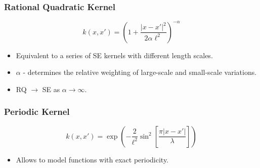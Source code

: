 \begin{frame} \frametitle{Rational Quadratic Kernel}
\begin{equation}
  k(x,x') = \left( 1 + \frac{\left|x-x'\right|^2}{2\alpha\ell^2} \right)^{-\alpha}
\end{equation}
\begin{itemize}
  \item Equivalent to a series of SE kernels with different length scales.
  \item $\alpha$ - determines the relative weighting of large-scale and
    small-scale variations.
  \item RQ $\rightarrow$ SE as $\alpha\rightarrow\infty$.
\end{itemize}
\begin{center}
\end{center}
\end{frame}

\begin{frame} \frametitle{Periodic Kernel}
\begin{equation}
  k(x,x') = \exp\left(-\frac{2}{\ell^2}\sin^2\left[\frac{\pi|x - x'|}{\lambda}\right]\right)
\end{equation}
\begin{itemize}
  \item Allows to model functions with exact periodicity.
\end{itemize}
\end{frame}

